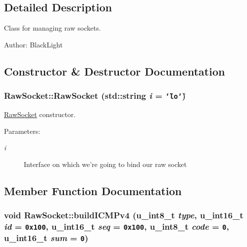 \subsection{Detailed Description}
Class for managing raw sockets. 

\begin{Desc}
\item[Author:]BlackLight \end{Desc}


\subsection{Constructor \& Destructor Documentation}
\hypertarget{classRawSocket_10fc562aa855e7f4b184af1d4f842ae0}{
\subsubsection[{RawSocket}]{\setlength{\rightskip}{0pt plus 5cm}RawSocket::RawSocket (std::string {\em i} = {\tt \char`\"{}lo\char`\"{}})}}
\label{classRawSocket_10fc562aa855e7f4b184af1d4f842ae0}


\hyperlink{classRawSocket}{RawSocket} constructor. 

\begin{Desc}
\item[Parameters:]
\begin{description}
\item[{\em i}]Interface on which we're going to bind our raw socket \end{description}
\end{Desc}


\subsection{Member Function Documentation}
\hypertarget{classRawSocket_07d676b2f5becf9fad465b7f63f9d3a3}{
\subsubsection[{buildICMPv4}]{\setlength{\rightskip}{0pt plus 5cm}void RawSocket::buildICMPv4 (u\_\-int8\_\-t {\em type}, \/  u\_\-int16\_\-t {\em id} = {\tt 0x100}, \/  u\_\-int16\_\-t {\em seq} = {\tt 0x100}, \/  u\_\-int8\_\-t {\em code} = {\tt 0}, \/  u\_\-int16\_\-t {\em sum} = {\tt 0})}}
\label{classRawSocket_07d676b2f5becf9fad465b7f63f9d3a3}


